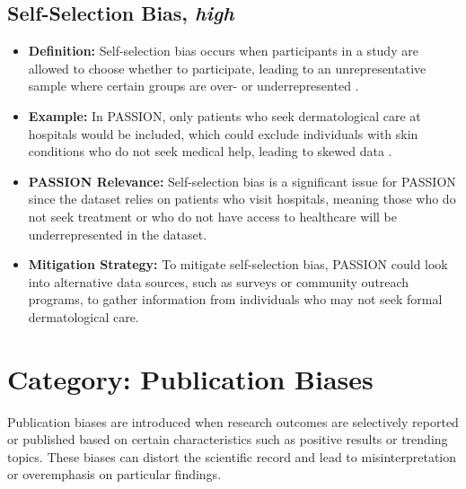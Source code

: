 \begin{refsection}
		\subsection{Self-Selection Bias, \textit{high}}
		\begin{itemize}
			\item \textbf{Definition:} Self-selection bias occurs when participants in a study are allowed to choose whether to participate, leading to an unrepresentative sample where certain groups are over- or underrepresented \autocites{Mester_2022}{Mehrabi_2021}.
			\item \textbf{Example:} In PASSION, only patients who seek dermatological care at hospitals would be included, which could exclude individuals with skin conditions who do not seek medical help, leading to skewed data \autocites{Mester_2022}{Mehrabi_2021}.
			\item \textbf{PASSION Relevance:} Self-selection bias is a significant issue for PASSION since the dataset relies on patients who visit hospitals, meaning those who do not seek treatment or who do not have access to healthcare will be underrepresented in the dataset.
			\item \textbf{Mitigation Strategy:} To mitigate self-selection bias, PASSION could look into alternative data sources, such as surveys or community outreach programs, to gather information from individuals who may not seek formal dermatological care.
		\end{itemize}
		
	\section{\textbf{Category:} Publication Biases}
	Publication biases are introduced when research outcomes are selectively reported or published based on certain characteristics such as positive results or trending topics. These biases can distort the scientific record and lead to misinterpretation or overemphasis on particular findings.
	

\end{refsection}
